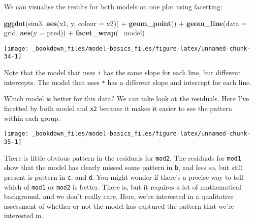 \documentclass[]{book}
\newenvironment{Shaded}{\begin{snugshade}}{\end{snugshade}}
\newcommand{\KeywordTok}[1]{\textcolor[rgb]{0.13,0.29,0.53}{\textbf{{#1}}}}
\newcommand{\DataTypeTok}[1]{\textcolor[rgb]{0.13,0.29,0.53}{{#1}}}
\newcommand{\StringTok}[1]{\textcolor[rgb]{0.31,0.60,0.02}{{#1}}}
\newcommand{\NormalTok}[1]{{#1}}
\begin{document}
We can visualise the results for both models on one plot using
facetting:

\begin{Shaded}
\begin{Highlighting}[]
\KeywordTok{ggplot}\NormalTok{(sim3, }\KeywordTok{aes}\NormalTok{(x1, y, }\DataTypeTok{colour =} \NormalTok{x2)) +}\StringTok{ }
\StringTok{  }\KeywordTok{geom_point}\NormalTok{() +}\StringTok{ }
\StringTok{  }\KeywordTok{geom_line}\NormalTok{(}\DataTypeTok{data =} \NormalTok{grid, }\KeywordTok{aes}\NormalTok{(}\DataTypeTok{y =} \NormalTok{pred)) +}\StringTok{ }
\StringTok{  }\KeywordTok{facet_wrap}\NormalTok{(~}\StringTok{ }\NormalTok{model)}
\end{Highlighting}
\end{Shaded}

\begin{center}\texttt{[image: \_bookdown\_files/model-basics\_files/figure-latex/unnamed-chunk-34-1]} \end{center}

Note that the model that uses \texttt{+} has the same slope for each
line, but different intercepts. The model that uses \texttt{*} has a
different slope and intercept for each line.

Which model is better for this data? We can take look at the residuals.
Here I've facetted by both model and \texttt{x2} because it makes it
easier to see the pattern within each group.

\begin{Shaded}
\end{Shaded}

\begin{center}\texttt{[image: \_bookdown\_files/model-basics\_files/figure-latex/unnamed-chunk-35-1]} \end{center}

There is little obvious pattern in the residuals for \texttt{mod2}. The
residuals for \texttt{mod1} show that the model has clearly missed some
pattern in \texttt{b}, and less so, but still present is pattern in
\texttt{c}, and \texttt{d}. You might wonder if there's a precise way to
tell which of \texttt{mod1} or \texttt{mod2} is better. There is, but it
requires a lot of mathematical background, and we don't really care.
Here, we're interested in a qualitative assessment of whether or not the
model has captured the pattern that we're interested in.
\end{document}
